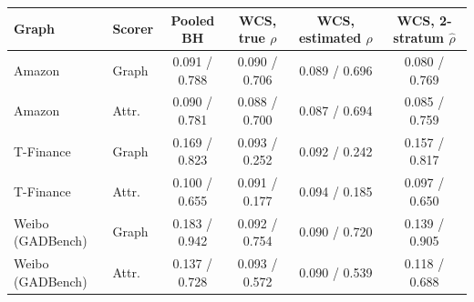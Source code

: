 \begin{tabular}{llcccc}
\toprule
Graph & Scorer & Pooled BH & WCS, true $\rho$ & WCS, estimated $\rho$ & WCS, 2-stratum $\hat\rho$\\
\midrule
Amazon & Graph & 0.091 / 0.788 & 0.090 / 0.706 & 0.089 / 0.696 & 0.080 / 0.769\\
Amazon & Attr. & 0.090 / 0.781 & 0.088 / 0.700 & 0.087 / 0.694 & 0.085 / 0.759\\
T-Finance & Graph & 0.169 / 0.823 & 0.093 / 0.252 & 0.092 / 0.242 & 0.157 / 0.817\\
T-Finance & Attr. & 0.100 / 0.655 & 0.091 / 0.177 & 0.094 / 0.185 & 0.097 / 0.650\\
Weibo (GADBench) & Graph & 0.183 / 0.942 & 0.092 / 0.754 & 0.090 / 0.720 & 0.139 / 0.905\\
Weibo (GADBench) & Attr. & 0.137 / 0.728 & 0.093 / 0.572 & 0.090 / 0.539 & 0.118 / 0.688\\
\bottomrule
\end{tabular}

